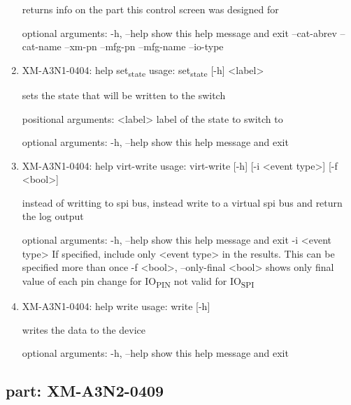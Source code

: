 \documentclass[11pt]{article}
\begin{document}
\begin{enumerate}
returns info on the part this control screen was designed for

optional arguments:
  -h, --help   show this help message and exit
  --cat-abrev
  --cat-name
  --xm-pn
  --mfg-pn
  --mfg-name
  --io-type

\item XM-A3N1-0404: help set\textsubscript{state}
\label{sec:org5f13ec5}
usage: set\textsubscript{state} [-h] <label>

sets the state that will be written to the switch

positional arguments:
  <label>     label of the state to switch to

optional arguments:
  -h, --help  show this help message and exit

\item XM-A3N1-0404: help virt-write
\label{sec:orga95aa45}
usage: virt-write [-h] [-i <event type>] [-f <bool>]

instead of writting to spi bus, instead write to a virtual spi bus and return
the log output

optional arguments:
  -h, --help            show this help message and exit
  -i <event type>       If specified, include only <event type> in the
                        results. This can be specified more than once
  -f <bool>, --only-final <bool>
                        shows only final value of each pin change for IO\textsubscript{PIN}
                        not valid for IO\textsubscript{SPI}

\item XM-A3N1-0404: help write
\label{sec:org87ec0f5}
usage: write [-h]

writes the data to the device

optional arguments:
  -h, --help  show this help message and exit
\end{enumerate}

\subsection{part: XM-A3N2-0409}
\label{sec:org80edb43}
\end{document}
